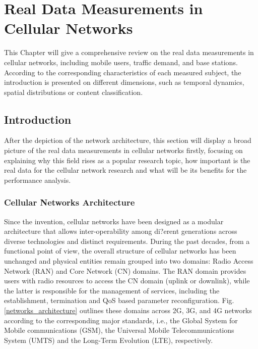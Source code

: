 
\chapter{Real Data Measurements in Cellular Networks} %

\label{Chapter2} %


This Chapter will give a comprehensive review on the real data measurements in cellular networks, including mobile users, traffic demand, and base stations. According to the corresponding characteristics of each measured subject, the introduction is presented on different dimensions, such as temporal dynamics, spatial distributions or content classification.

\section{Introduction}
After the depiction of the network architecture, this section will display a broad picture of the real data measurements in cellular networks firstly, focusing on explaining why this field rises as a popular research topic, how important is the real data for the cellular network research and what will be its benefits for the performance analysis.

\subsection{Cellular Networks Architecture}
Since the invention, cellular networks have been designed as a modular architecture that allows inter-operability among di?erent generations across diverse technologies and distinct requirements. During the past decades, from a functional point of view, the overall structure of cellular networks has been unchanged and physical entities remain grouped into two domains: Radio Access Network (RAN) and Core Network (CN) domains. The RAN domain provides users with radio resources to access the CN domain (uplink or downlink), while the latter is responsible for the management of services, including the establishment, termination and QoS based parameter reconfiguration. Fig. \ref{networks_architecture} outlines these domains across 2G, 3G, and 4G networks according to the corresponding major standards, i.e., the Global System for Mobile communications (GSM), the Universal Mobile Telecommunications System (UMTS) and the Long-Term Evolution (LTE), respectively.

